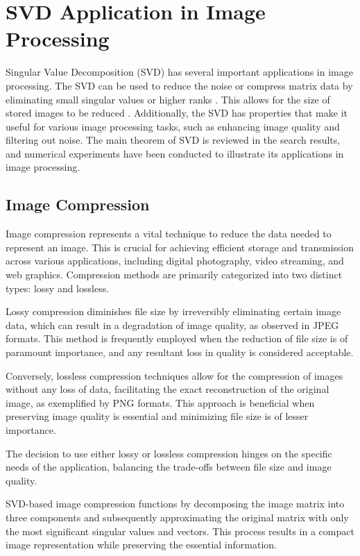 \documentclass[
  journal,
]{IEEEtran}%
\begin{document}
\section{SVD Application in Image
Processing}\label{svd-application-in-image-processing}

Singular Value Decomposition (SVD) has several important applications in
image processing. The SVD can be used to reduce the noise or compress
matrix data by eliminating small singular values or higher ranks
. This allows for the size of
stored images to be reduced .
Additionally, the SVD has properties that make it useful for various
image processing tasks, such as enhancing image quality and filtering
out noise. The main theorem of SVD is reviewed in the search results,
and numerical experiments have been conducted to illustrate its
applications in image processing.

\subsection{Image Compression}\label{image-compression}

Image compression represents a vital technique to reduce the data needed
to represent an image. This is crucial for achieving efficient storage
and transmission across various applications, including digital
photography, video streaming, and web graphics. Compression methods are
primarily categorized into two distinct types: lossy and lossless.

Lossy compression diminishes file size by irreversibly eliminating
certain image data, which can result in a degradation of image quality,
as observed in JPEG formats. This method is frequently employed when the
reduction of file size is of paramount importance, and any resultant
loss in quality is considered acceptable.

Conversely, lossless compression techniques allow for the compression of
images without any loss of data, facilitating the exact reconstruction
of the original image, as exemplified by PNG formats. This approach is
beneficial when preserving image quality is essential and minimizing
file size is of lesser importance.

The decision to use either lossy or lossless compression hinges on the
specific needs of the application, balancing the trade-offs between file
size and image quality.

SVD-based image compression functions by decomposing the image matrix
into three components and subsequently approximating the original matrix
with only the most significant singular values and vectors. This process
results in a compact image representation while preserving the essential
information.
\end{document}
